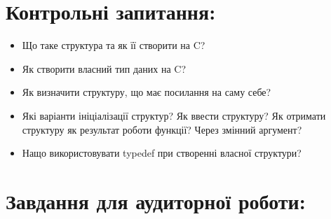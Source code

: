 \documentclass[a5paper,titlepage,openany,twoside,draft]{book_unv}%
\begin{document}
\section{Контрольні запитання:}
\begin{itemize}
\item Що таке структура та як її створити на C?
\item Як створити власний тип даних на C?
\item Як визначити структуру, що має посилання на саму себе?
\item Які варіанти ініціалізації структур? Як ввести структуру? Як отримати
структуру як результат роботи функції? Через змінний аргумент?
\item Нащо використовувати typedef при створенні власної структури?
\end{itemize}

\section{Завдання для аудиторної роботи:}
\end{document}
